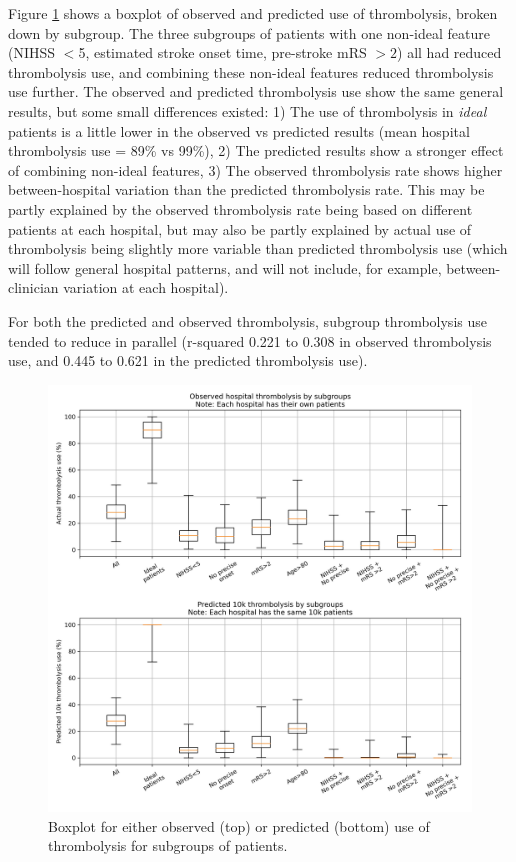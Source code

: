 Figure \ref{fig:results_boxplot} shows a boxplot of observed and predicted use of thrombolysis, broken down by subgroup. The three subgroups of patients with one non-ideal feature (NIHSS $<$5, estimated stroke onset time, pre-stroke mRS $>2$) all had reduced thrombolysis use, and combining these non-ideal features reduced thrombolysis use further. The observed and predicted thrombolysis use show the same general results, but some small differences existed: 1) The use of thrombolysis in \emph{ideal} patients is a little lower in the observed vs predicted results (mean hospital thrombolysis use = 89\% vs 99\%), 2) The predicted results show a stronger effect of combining non-ideal features, 3) The observed thrombolysis rate shows higher between-hospital variation than the predicted thrombolysis rate. This may be partly explained by the observed thrombolysis rate being based on different patients at each hospital, but may also be partly explained by actual use of thrombolysis being slightly more variable than predicted thrombolysis use (which will follow general hospital patterns, and will not include, for example, between-clinician variation at each hospital).

For both the predicted and observed thrombolysis, subgroup thrombolysis use tended to reduce in parallel (r-squared 0.221 to 0.308 in observed thrombolysis use, and 0.445 to 0.621 in the predicted thrombolysis use). 

\begin{figure}[!h]
\centering
\includegraphics[width=1\textwidth]{./images/15a_actual_vs_modelled_subgroup_violin}
\caption{Boxplot for either observed (top) or predicted (bottom) use of thrombolysis for subgroups of patients.}
\label{fig:results_boxplot}
\end{figure}
\fi

